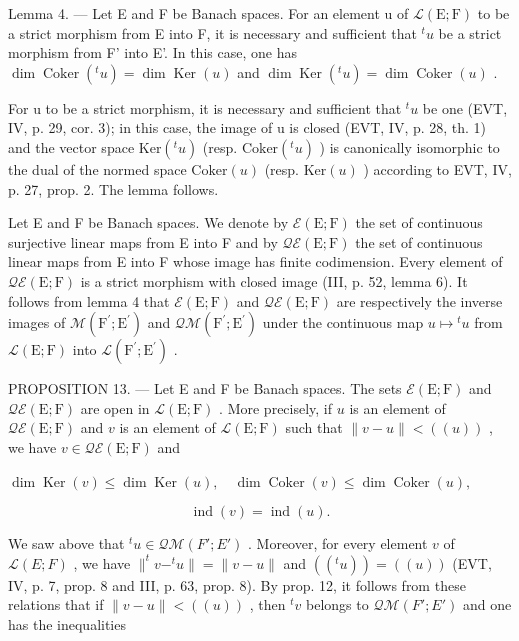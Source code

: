 Lemma 4. --- Let E and F be Banach spaces. For an element u of \(\mathcal{L}(\mathrm{E};\mathrm{F})\) to be a strict morphism from E into F, it is necessary and sufficient that \(^{t}u\) be a strict morphism from F' into E'. In this case, one has \(\dim \operatorname{Coker}(^{t}u)=\dim\operatorname{Ker}(u)\) and \(\dim\operatorname{Ker}(^{t}u)=\dim\operatorname{Coker}(u)\) .

For u to be a strict morphism, it is necessary and sufficient that \(^{t}u\) be one (EVT, IV, p. 29, cor. 3); in this case, the image of u is closed (EVT, IV, p. 28, th. 1) and the vector space \(\mathrm{Ker}(^{t}u)\) (resp. \(\mathrm{Coker}(^{t}u)\) ) is canonically isomorphic to the dual of the normed space \(\mathrm{Coker}(u)\) (resp. \(\mathrm{Ker}(u)\) ) according to EVT, IV, p. 27, prop. 2. The lemma follows.

Let E and F be Banach spaces. We denote by \(\mathcal{E}(\mathrm{E};\mathrm{F})\) the set of continuous surjective linear maps from E into F and by \(\mathcal{Q}\mathcal{E}(\mathrm{E};\mathrm{F})\) the set of continuous linear maps from E into F whose image has finite codimension. Every element of \(\mathcal{Q}\mathcal{E}(\mathrm{E};\mathrm{F})\) is a strict morphism with closed image (III, p. 52, lemma 6). It follows from lemma 4 that \(\mathcal{E}(\mathrm{E};\mathrm{F})\) and \(\mathcal{Q}\mathcal{E}(\mathrm{E};\mathrm{F})\) are respectively the inverse images of \(\mathcal{M}(\mathrm{F}^{\prime};\mathrm{E}^{\prime})\) and \(\mathcal{Q}\mathcal{M}(\mathrm{F}^{\prime};\mathrm{E}^{\prime})\) under the continuous map \(u\mapsto{}^{t}u\) from \(\mathcal{L}(\mathrm{E};\mathrm{F})\) into \(\mathcal{L}(\mathrm{F}^{\prime};\mathrm{E}^{\prime})\) .

PROPOSITION 13. --- Let E and F be Banach spaces. The sets \(\mathcal{E}(\mathrm{E};\mathrm{F})\) and \(\mathcal{Q}\mathcal{E}(\mathrm{E};\mathrm{F})\) are open in \(\mathcal{L}(\mathrm{E};\mathrm{F})\) . More precisely, if \(u\) is an element of \(\mathcal{Q}\mathcal{E}(\mathrm{E};\mathrm{F})\) and \(v\) is an element of \(\mathcal{L}(\mathrm{E};\mathrm{F})\) such that \(\| v - u\| < ((u))\) , we have \(v \in \mathcal{Q}\mathcal{E}(\mathrm{E};\mathrm{F})\) and

\(\dim \operatorname{Ker}(v) \leqslant \dim \operatorname{Ker}(u), \quad \dim \operatorname{Coker}(v) \leqslant \dim \operatorname{Coker}(u),\)

\[
\operatorname{ind} (v) = \operatorname{ind} (u).
\]

We saw above that \(^{t}u \in \mathcal{Q}\mathcal{M}(F';E')\) . Moreover, for every element \(v\) of \(\mathcal{L}(E;F)\) , we have \(\|^{t}v - ^{t}u\| = \|v - u\|\) and \(((^{t}u)) = ((u))\) (EVT, IV, p. 7, prop. 8 and III, p. 63, prop. 8). By prop. 12, it follows from these relations that if \(\|v - u\| < ((u))\) , then \(^{t}v\) belongs to \(\mathcal{Q}\mathcal{M}(F';E')\) and one has the inequalities

